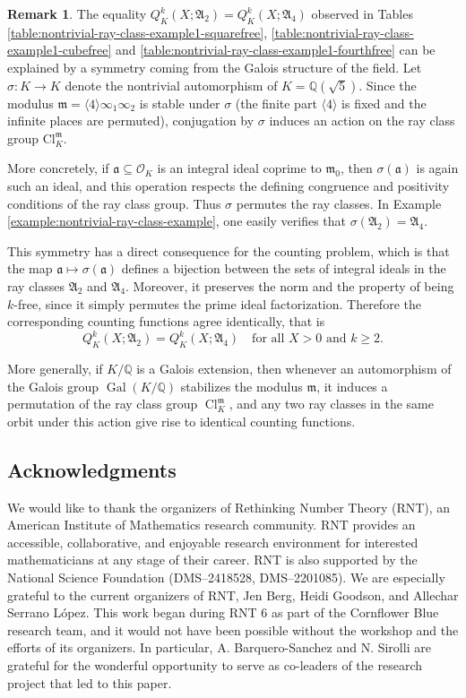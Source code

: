 \documentclass[11pt, reqno]{amsart}
\numberwithin{equation}{section}
\newcommand{\Q}{\mathbb{Q}}
\newcommand{\Gal}[1]{\operatorname{Gal}#1}
\newcommand{\op}[1]{\operatorname{#1}}
\theoremstyle{definition}
\newtheorem{remark}[theorem]{Remark}
\begin{document}
\begin{remark}\label{remark:same-counting-values}
The equality $Q_K^k(X;\mathfrak A_2)=Q_K^k(X;\mathfrak A_4)$ observed in Tables \ref{table:nontrivial-ray-class-example1-squarefree}, \ref{table:nontrivial-ray-class-example1-cubefree} and \ref{table:nontrivial-ray-class-example1-fourthfree} can be explained by a symmetry coming from the Galois structure of the field. Let $\sigma \colon K \longrightarrow K$ denote the nontrivial automorphism of $K=\mathbb{Q}(\sqrt{5})$. Since the modulus $\mathfrak m= \langle 4 \rangle \infty_1\infty_2$ is stable under $\sigma$ (the finite part $\langle 4 \rangle$ is fixed and the infinite places are permuted), conjugation by $\sigma$ induces an action on the ray class group $\mathrm{Cl}_K^{\mathfrak m}$.

More concretely, if $\mathfrak a \subseteq \mathcal{O}_K$ is an integral ideal coprime to $\mathfrak m_0$, then $\sigma(\mathfrak a)$ is again such an ideal, and this operation respects the defining congruence and positivity conditions of the ray class group. Thus $\sigma$ permutes the ray classes. In Example \ref{example:nontrivial-ray-class-example}, one easily verifies that $\sigma(\mathfrak A_2)=\mathfrak A_4$.

This symmetry has a direct consequence for the counting problem, which is that the map $\mathfrak a \mapsto \sigma(\mathfrak a)$ defines a bijection between the sets of integral ideals in the ray classes $\mathfrak A_2$ and $\mathfrak A_4$. Moreover, it preserves the norm and the property of being $k$-free, since it simply permutes the prime ideal factorization. Therefore the corresponding counting functions agree identically, that is
\[
Q_K^k(X;\mathfrak A_2)=Q_K^k(X;\mathfrak A_4)
\quad \text{for all } X>0 \text{ and } k \geq 2.
\]

More generally, if $K/\Q$ is a Galois extension, then whenever an automorphism of the Galois group $\Gal{(K/\Q)}$ stabilizes the modulus $\mathfrak m$, it induces a permutation of the ray class group $\op{Cl}_K^{\mathfrak{m}}$, and any two ray classes in the same orbit under this action give rise to identical counting functions.
\end{remark}


\subsection{Acknowledgments}

We would like to thank the organizers of Rethinking Number Theory (RNT), an American Institute of Mathematics research community. RNT provides an accessible, collaborative, and enjoyable research environment for interested mathematicians at any stage of their career. RNT is also supported by the National Science Foundation (DMS--2418528, DMS--2201085). We are especially grateful to the current organizers of RNT, Jen Berg, Heidi Goodson, and Allechar Serrano López. This work began during RNT 6 as part of the Cornflower Blue research team, and it would not have been possible without the workshop and the efforts of its organizers. In particular, A. Barquero-Sanchez and N. Sirolli are grateful for the wonderful opportunity to serve as co-leaders of the research project that led to this paper.
\end{document}
